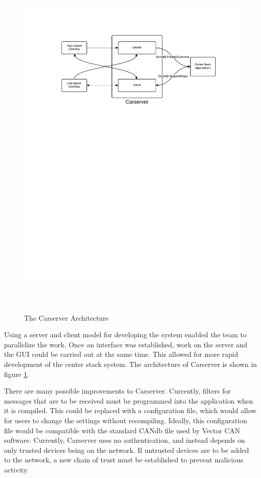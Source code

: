 \documentclass[ece]{uw-wkrpt}
\begin{document}
\begin{figure}
    \centering
    \includegraphics[height=7in]{carserver}
    \caption[The Carserver Architecture]{The Carserver Architecture}
    \label{ref:carserver}
\end{figure}

Using a server and client model for developing the system enabled the team to
parallelize the work. Once an interface was established, work on the server and
the GUI could be carried out at the same time. This allowed for more rapid
development of the center stack system. The architecture of Carserver is shown
in figure \ref{ref:carserver}.

There are many possible improvements to Carserver. Currently, filters for messages that
are to be received must be programmed into the application when it is compiled. This
could be replaced with a configuration file, which would allow for users to
change the settings without recompiling. Ideally, this configuration file would
be compatible with the standard CANdb file used by Vector CAN software.
Currently, Carserver uses no authentication, and instead depends on only trusted
devices being on the network. If untrusted devices are to be added to the
network, a new chain of trust must be established to prevent malicious activity.
\end{document}

